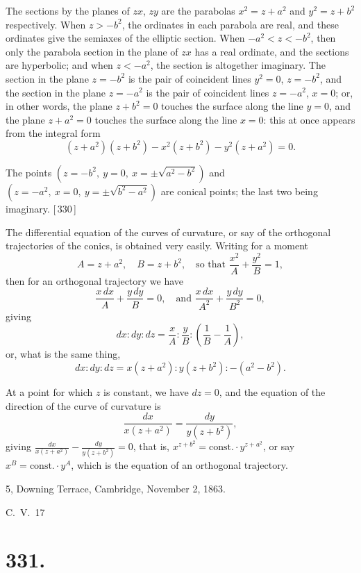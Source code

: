\documentclass[11pt,a4paper]{article}
\begin{document}
The sections by the planes of $zx$, $zy$ are the parabolas $x^2 = z+a^2$ and $y^2 = z+b^2$ respectively. When $z > -b^2$, the ordinates in each parabola are real, and these ordinates give the semiaxes of the elliptic section. When $-a^2 < z < -b^2$, then only the parabola section in the plane of $zx$ has a real ordinate, and the sections are hyperbolic; and when $z < -a^2$, the section is altogether imaginary. The section in the plane $z = -b^2$ is the pair of coincident lines $y^2=0$, $z=-b^2$, and the section in the plane $z = -a^2$ is the pair of coincident lines $z=-a^2$, $x=0$; or, in other words, the plane $z+b^2=0$ touches the surface along the line $y=0$, and the plane $z+a^2=0$ touches the surface along the line $x=0$: this at once appears from the integral form
\[
(z+a^2)(z+b^2) - x^2(z+b^2) - y^2(z+a^2) = 0.
\]

The points $(z=-b^2,\ y=0,\ x=\pm\sqrt{a^2-b^2})$ and $(z=-a^2,\ x=0,\ y=\pm\sqrt{b^2-a^2})$ are conical points; the last two being imaginary. [\,330\,]

The differential equation of the curves of curvature, or say of the orthogonal trajectories of the conics, is obtained very easily. Writing for a moment
\[
A = z + a^2, \quad B = z + b^2, \quad \text{so that } \frac{x^2}{A} + \frac{y^2}{B} = 1,
\]
then for an orthogonal trajectory we have
\[
\frac{x\,dx}{A} + \frac{y\,dy}{B} = 0, \quad \text{and } \frac{x\,dx}{A^2} + \frac{y\,dy}{B^2} = 0,
\]
giving
\[
dx : dy : dz = \frac{x}{A} : \frac{y}{B} : \left(\frac{1}{B} - \frac{1}{A}\right),
\]
or, what is the same thing,
\[
dx : dy : dz = x(z+a^2) : y(z+b^2) : -(a^2-b^2).
\]

At a point for which $z$ is constant, we have $dz=0$, and the equation of the direction of the curve of curvature is
\[
\frac{dx}{x(z+a^2)} = \frac{dy}{y(z+b^2)},
\]
giving $\frac{dx}{x(z+a^2)} - \frac{dy}{y(z+b^2)} = 0$, that is, $x^{z+b^2} = \text{const.} \cdot y^{z+a^2}$, or say $x^{B} = \text{const.} \cdot y^{A}$, which is the equation of an orthogonal trajectory.

\begin{flushright}
5, Downing Terrace, Cambridge, November 2, 1863.
\end{flushright}
\noindent C.\ V.\ 17


\newpage
\section*{331.}
\end{document}
